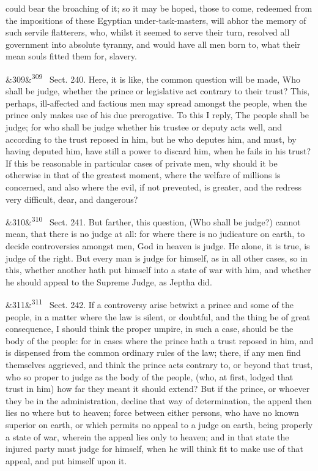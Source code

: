 \documentclass[12pt]{article}
\newcommand{\para}[1][]{\par\noindent\ifx&#1&\else\textsuperscript{\footnotesize #1}~\fi}
\begin{document}
could bear the broaching of it; so it may be hoped, those to come, redeemed from the impositions of these Egyptian under-task-masters, will abhor the memory of such servile flatterers, who, whilst it seemed to serve their turn, resolved all government into absolute tyranny, and would have all men born to, what their mean souls fitted them for, slavery.

\para[309] Sect. 240. Here, it is like, the common question will be made, Who shall be judge, whether the prince or legislative act contrary to their trust? This, perhaps, ill-affected and factious men may spread amongst the people, when the prince only makes use of his due prerogative. To this I reply, The people shall be judge; for who shall be judge whether his trustee or deputy acts well, and according to the trust reposed in him, but he who deputes him, and must, by having deputed him, have still a power to discard him, when he fails in his trust? If this be reasonable in particular cases of private men, why should it be otherwise in that of the greatest moment, where the welfare of millions is concerned, and also where the evil, if not prevented, is greater, and the redress very difficult, dear, and dangerous?

\para[310] Sect. 241. But farther, this question, (Who shall be judge?) cannot mean, that there is no judge at all: for where there is no judicature on earth, to decide controversies amongst men, God in heaven is judge. He alone, it is true, is judge of the right. But every man is judge for himself, as in all other cases, so in this, whether another hath put himself into a state of war with him, and whether he should appeal to the Supreme Judge, as Jeptha did.

\para[311] Sect. 242. If a controversy arise betwixt a prince and some of the people, in a matter where the law is silent, or doubtful, and the thing be of great consequence, I should think the proper umpire, in such a case, should be the body of the people: for in cases where the prince hath a trust reposed in him, and is dispensed from the common ordinary rules of the law; there, if any men find themselves aggrieved, and think the prince acts contrary to, or beyond that trust, who so proper to judge as the body of the people, (who, at first, lodged that trust in him) how far they meant it should extend? But if the prince, or whoever they be in the administration, decline that way of determination, the appeal then lies no where but to heaven; force between either persons, who have no known superior on earth, or which permits no appeal to a judge on earth, being properly a state of war, wherein the appeal lies only to heaven; and in that state the injured party must judge for himself, when he will think fit to make use of that appeal, and put himself upon it.
\end{document}
